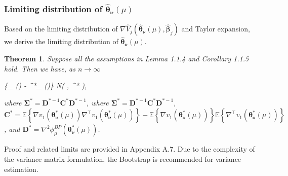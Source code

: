 \documentclass{article}
\newcommand{\wh}{\widehat}
\newcommand{\itl}{\intercal}
\newcommand{\bs}{ \boldsymbol}
\newcommand{\lt}{\left}
\newcommand{\rt}{\right}
\newtheorem{theorem}{Theorem}[section]
\begin{document}
\subsubsection{Limiting distribution of $\widehat{\bs{\theta}}_{\bs{\nu}}\lt(\mu\rt)$}
Based on the limiting distribution of $\nabla\wh{V}_j\lt(\wh{\bs{\theta}}_{\bs{\nu}}\lt(\mu\rt)  , \wh{\bs{\beta}}_j\rt)$ and Taylor expansion, we derive the limiting distribution of $\widehat{\bs{\theta}}_{\bs{\nu}}\lt(\mu\rt)$.
\begin{theorem}
	Suppose all the assumptions in Lemma 1.1.4 and Corollary 1.1.5 hold. Then we have, as $n\to \infty$
	\begin{flalign*}
	\lt\{\widehat{\bs{\theta}}_{\bs{\nu}}(\mu) - \bs{\theta}^*_{\bs{\nu}}(\mu)\rt\}  N\lt(\bs{0}, \bs{\Sigma}^* \rt),
	\end{flalign*}
	where $\bs{\Sigma}^* = \bs{D}^{*-1}\bs{C}^{*}\bs{D}^{*-1}$, 
	where $\bs{\Sigma}^* = \bs{D}^{*-1}\bs{C}^{*}\bs{D}^{*-1}$,
	$\bs{C}^* =\mathbb{E}\lt\{  \nabla v_1\lt(\bs{\theta}^*_{\bs{\nu}}(\mu)\rt)\nabla^{\itl} v_1\lt(\bs{\theta}^*_{\bs{\nu}}(\mu)\rt) \rt\} - \mathbb{E}\lt\{\nabla v_1\lt(\bs{\theta}^*_{\bs{\nu}}(\mu)\rt)\rt\} \mathbb{E}\lt\{\nabla^{\itl} v_1\lt(\bs{\theta}^*_{\bs{\nu}}(\mu)\rt)\rt\}$,  and $\bs{D}^*  =  \nabla^2 \phi_{\mu}^{BP}(\bs{\theta}^*_{\bs{\nu}}(\mu))$.
\end{theorem}
Proof and related limits are provided in Appendix A.7.  Due to the complexity of the variance matrix formulation, the Bootstrap is recommended for variance estimation.
\end{document}
